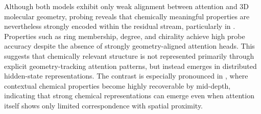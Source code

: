 Although both models exhibit only weak alignment between attention and 3D molecular geometry, probing reveals that chemically meaningful properties are nevertheless strongly encoded within the residual stream, particularly in \smi. Properties such as ring membership, degree, and chirality achieve high probe accuracy despite the absence of strongly geometry-aligned attention heads. This suggests that chemically relevant structure is not represented primarily through explicit geometry-tracking attention patterns, but instead emerges in distributed hidden-state representations. The contrast is especially pronounced in \smi, where contextual chemical properties become highly recoverable by mid-depth, indicating that strong chemical representations can emerge even when attention itself shows only limited correspondence with spatial proximity.